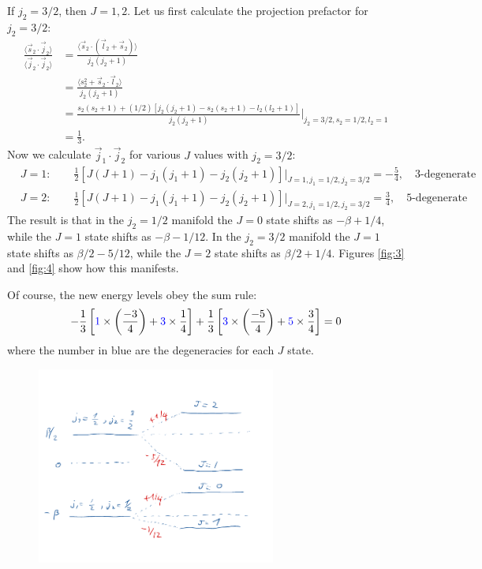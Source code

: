 \documentclass{article}
\theoremstyle{definition}
\newcommand{\be}{\beta}
\newcommand{\f}[2]{\frac{#1}{#2}}
\newcommand{\lp}{\left(}
\newcommand{\rp}{\right)}
\newcommand{\lb}{\left[}
\newcommand{\rb}{\right]}
\begin{document}
\begin{enumerate}[label=(\alph*)]
	
	If $j_2=3/2$, then $J=1,2$. Let us first calculate the projection prefactor for $j_2=3/2$:
	\begin{align*}
	\f{\langle \vec{s}_2 \cdot \vec{j}_2 \rangle}{\langle \vec{j}_2 \cdot \vec{j}_2\rangle} 
	&= \f{\langle \vec{s}_2 \cdot (\vec{l}_2 + \vec{s}_2)\rangle }{j_2(j_2+1)}  \\
	&= \f{\langle s_2^2 + \vec{s}_2\cdot \vec{l}_2  \rangle }{j_2(j_2+1)}  \\
	&= \f{s_2(s_2+1) +(1/2)[j_2(j_2+1) - s_2(s_2+1) - l_2(l_2+1)]}{j_2(j_2+1)}\bigg\vert_{j_2=3/2,s_2=1/2,l_2 =1}\\
	&= \f{1}{3}.
	\end{align*}
	Now we calculate $\vec{j}_1\cdot \vec{j}_2$ for various $J$ values with $j_2=3/2$:
	\begin{align*}
	&J=1: \quad\quad \f{1}{2}[J(J+1)-j_1(j_1+1)-j_2(j_2+1)]\bigg\vert_{J=1,j_1=1/2,j_2=3/2} =  -\f{5}{4},\quad \text{3-degenerate} \\
	&J=2: \quad\quad \f{1}{2}[J(J+1)-j_1(j_1+1)-j_2(j_2+1)]\bigg\vert_{J=2,j_1=1/2,j_2=3/2} =  \f{3}{4}, \quad \text{5-degenerate}
	\end{align*}
	The result is that in the $j_2=1/2$ manifold the $J=0$ state shifts as $-\be + 1/4$, while the $J=1$ state shifts as $-\be -1/12$. In the $j_2=3/2$ manifold the $J=1$ state shifts as $\be/2 -5/12$, while the $J=2$ state shifts as $\be/2 + 1/4$. Figures \ref{fig:3} and \ref{fig:4} show how this manifests. 
	
	
	
	
	Of course, the new energy levels obey the sum rule: 
	\begin{align*}
	-\f{1}{3}\lb \textcolor{blue}{1}\times\lp \f{-3}{4}\rp + \textcolor{blue}{3}\times \f{1}{4} \rb + \f{1}{3}\lb \textcolor{blue}{3}\times\lp \f{-5}{4}\rp + \textcolor{blue}{5}\times \f{3}{4}  \rb = 0
	\end{align*}
	where the number in blue are the degeneracies for each $J$ state. 
	
	
	
	\begin{figure}[!htb]
		\centering
		\includegraphics[width=0.7\textwidth]{levels_2.png}
	\end{figure}
	

\end{enumerate}
\end{document}
